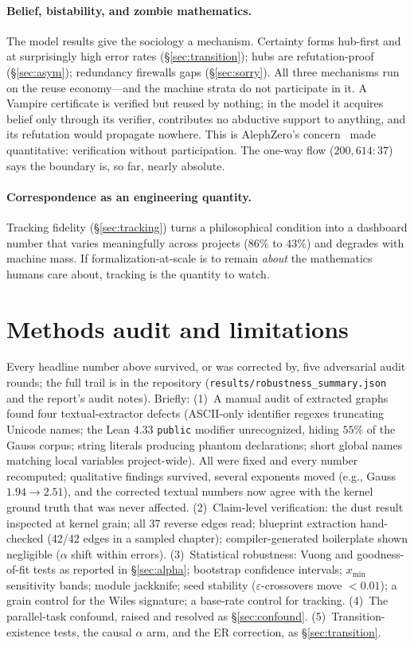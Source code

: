 \documentclass[11pt]{article}
\newcommand{\eps}{\varepsilon}
\begin{document}
\paragraph{Belief, bistability, and zombie mathematics.} The model results give the sociology a
mechanism. Certainty forms hub-first and at surprisingly high error rates
(\S\ref{sec:transition}); hubs are refutation-proof (\S\ref{sec:asym}); redundancy firewalls
gaps (\S\ref{sec:sorry}). All three mechanisms run on the reuse economy---and the machine
strata do not participate in it. A Vampire certificate is verified but reused by nothing;
in the model it acquires belief only through its verifier, contributes no abductive support to
anything, and its refutation would propagate nowhere. This is AlephZero's
concern~\cite{dedeo2024} made quantitative: verification without participation. The one-way
flow ($200{,}614{:}37$) says the boundary is, so far, nearly absolute.

\paragraph{Correspondence as an engineering quantity.} Tracking fidelity (\S\ref{sec:tracking})
turns a philosophical condition into a dashboard number that varies meaningfully across
projects ($86\%$ to $43\%$) and degrades with machine mass. If formalization-at-scale is to
remain \emph{about} the mathematics humans care about, tracking is the quantity to watch.

\section{Methods audit and limitations}
\label{sec:audit}

Every headline number above survived, or was corrected by, five adversarial audit rounds; the
full trail is in the repository (\texttt{results/robustness\_summary.json} and the report's
audit notes). Briefly: (1)~A manual audit of extracted graphs found four textual-extractor
defects (ASCII-only identifier regexes truncating Unicode names; the Lean 4.33 \texttt{public}
modifier unrecognized, hiding $55\%$ of the Gauss corpus; string literals producing phantom
declarations; short global names matching local variables project-wide). All were fixed and
every number recomputed; qualitative findings survived, several exponents moved (e.g., Gauss
$1.94 \to 2.51$), and the corrected textual numbers now agree with the kernel ground truth that
was never affected. (2)~Claim-level verification: the dust result inspected at kernel grain;
all 37 reverse edges read; blueprint extraction hand-checked (42/42 edges in a sampled
chapter); compiler-generated boilerplate shown negligible ($\alpha$ shift within errors).
(3)~Statistical robustness: Vuong and goodness-of-fit tests as reported in \S\ref{sec:alpha};
bootstrap confidence intervals; $x_{\min}$ sensitivity bands; module jackknife; seed stability
($\eps$-crossovers move $< 0.01$); a grain control for the Wiles signature; a base-rate control
for tracking. (4)~The parallel-task confound, raised and resolved as \S\ref{sec:confound}.
(5)~Transition-existence tests, the causal $\alpha$ arm, and the ER correction, as
\S\ref{sec:transition}.
\end{document}
